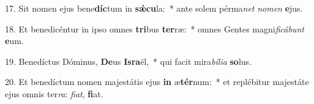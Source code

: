 17. Sit nomen ejus bene\textbf{díc}tum in \textbf{sǽ}\textbf{cu}la:~*  ante solem pérma\textit{net} \textit{no}\textit{men} \textbf{e}jus.\

18. Et benedicéntur in ipso omnes \textbf{tri}bus \textbf{ter}ræ:~*  omnes Gentes magni\textit{fi}\textit{cá}\textit{bunt} \textbf{e}um.\

19. Benedíctus Dóminus, \textbf{De}us \textbf{Is}\textbf{ra}ël,~*  qui facit mira\textit{bí}\textit{li}\textit{a} \textbf{so}lus.\

20. Et benedíctum nomen majestátis ejus \textbf{in} æ\textbf{tér}num:~*  et replébitur majestáte ejus omnis ter\textit{ra}: \textit{fi}\textit{at}, \textbf{fi}at.\


